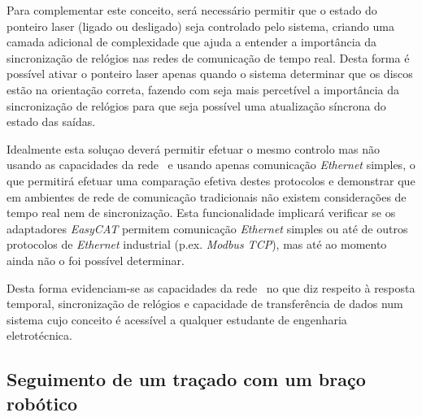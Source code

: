 Para complementar este conceito, será necessário permitir que o estado
do ponteiro laser (ligado ou desligado) seja controlado pelo sistema,
criando uma camada adicional de complexidade que ajuda a entender a
importância da sincronização de relógios nas redes de comunicação de
tempo real. Desta forma é possível ativar o ponteiro laser apenas quando
o sistema  determinar que os discos estão na orientação correta, fazendo
com seja mais percetível a importância da sincronização de relógios para
que seja possível uma atualização síncrona do estado das saídas.

Idealmente esta soluçao deverá permitir efetuar o mesmo controlo mas não
usando as capacidades da rede \ecat\ e usando apenas comunicação
\emph{Ethernet} simples, o que permitirá efetuar uma comparação efetiva
destes protocolos e demonstrar que em ambientes de rede de comunicação
tradicionais não existem considerações de tempo real nem de sincronização.
Esta funcionalidade implicará verificar se os adaptadores \emph{EasyCAT}
permitem comunicação \emph{Ethernet} simples ou até de outros protocolos
de \emph{Ethernet} industrial (p.ex. \emph{Modbus TCP}), mas até ao momento
ainda não o foi possível determinar.

Desta forma evidenciam-se as capacidades da rede \ecat\ no que diz
respeito à resposta temporal, sincronização de relógios e capacidade de
transferência de dados num sistema cujo conceito é acessível a qualquer
estudante de engenharia eletrotécnica.


\subsection{Seguimento de um traçado com um braço robótico}


